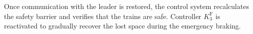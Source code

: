 \documentclass[letterpaper, 10 pt, conference]{ieeeconf}
\theoremstyle{definition}
\theoremstyle{nopoint}
\newcommand{\tildeAdd}{~}
\begin{document}
		Once communication with the leader is restored, the control system recalculates the safety barrier and verifies that the trains are safe. Controller $K_3^\mathrm{F}$ is reactivated to gradually recover the lost space during the emergency braking.
		
		
		
		\begin{comment}
			
			I risultati della simulazione per lo scenario \gls{os}1 e \gls{os}2 sono riportati nelle Figure\tildeAdd\ref{fig:os1_a}-\tildeAdd\ref{fig:os1_h} e\tildeAdd\ref{fig:os2_a}-\tildeAdd\ref{fig:os2_h} rispettivamente, per motivi di leggibilità sono state rimosse le dipendenze delle variabili mostrate dal tempo all'interno delle legende ed è stato omessa l'unita di misura dell'asse delle ascisse che definiamo qui essere espresso in secondi.	
			
			Considerando il primo scenario, è possibile notare in Figura\tildeAdd\ref{fig:os1_c} che il follower all'inizio della simulazione essendo molto distante dal leader, il primo controllore  selezionato dal sistema di controllo è $K_1^\mathrm{F}$, questo controllore imprime una forza, presente in Figura\tildeAdd\ref{fig:os1_f}, tale da aumentare la velocità fino a raggiungere valori di velocità di circa $80\frac{\unit{\meter}}{\unit{\second}}$ come da Figura\tildeAdd\ref{fig:os1_c}. Una volta raggiunto l'istante di tempo $120\unit{\second}$, in Figura\tildeAdd\ref{fig:os1_h}, è possibile notare come la posizione del follower a causa dell'elevata veocità ha raggiunto la regione di stato oltre $z_{\tau_1}^\mathrm{F}$ il quale ha fatto scattare il controllore  $K_3^\mathrm{F}$ come evidente anche dalla Figura\tildeAdd\ref{fig:os1_d}, il quale tende frenare il follower fino a farlo approcciare alla stessa velocità del leader. Intorno al tempo $600\unit{\second}$ il sistema di controllo del follower stabilizza la posizione del follower ad una distanza rispetto al leader di circa $1300 \unit{\meter}$ come è possibile vedere nella Figura\tildeAdd\ref{fig:os1_b}, realizzando il virtual coupling tra i due treni. Lungo tutta la simulazione il leader varierà la sua velocità agli istanti di tempo $800\unit{\second}$ e $1600\unit{\second}$ rispettivamente a $60\frac{\unit{\meter}}{\unit{\second}}$ e $40\frac{\unit{\meter}}{\unit{\second}}$, ed anche in questi casi il sistema di controllo proposto realizza il \gls{vc} tra i due treni: importante notare che fino ad adesso la safety barrier presente in Figura\tildeAdd\ref{fig:os1_a} ha assunto valori sempre negativi.
			

\end{comment}
\end{document}
